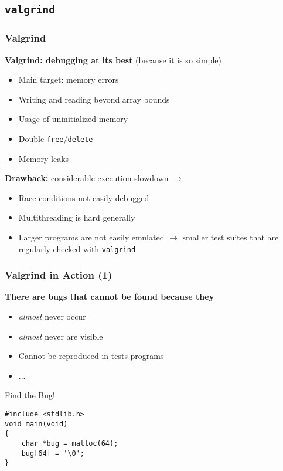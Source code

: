 \subsection{\texttt{valgrind}}

\begin{frame}
  \frametitle{Valgrind}

  \textbf{Valgrind: debugging at its best} (because it is so simple)

  \begin{itemize}
  \item Main target: memory errors
  \item Writing and reading beyond array bounds
  \item Usage of uninitialized memory
  \item Double \texttt{free}/\texttt{delete}
  \item Memory leaks
  \end{itemize}
  
  \textbf{Drawback:} considerable execution slowdown $\to$
  \begin{itemize}
    \item Race conditions not easily debugged
    \item Multithreading is hard generally
    \item Larger programs are not easily emulated $\to$ smaller test
      suites that are regularly checked with \texttt{valgrind}
  \end{itemize}
  
\end{frame}

\begin{frame}[fragile]
  \frametitle{Valgrind in Action (1)}


  \textbf{There are bugs that cannot be found because they}

  \begin{itemize}
  \item \textit{almost} never occur
  \item \textit{almost} never are visible
  \item Cannot be reproduced in tests programs
  \item ...
  \end{itemize}

  \begin{block}{Find the Bug!}
\begin{verbatim}
#include <stdlib.h>
void main(void)
{
    char *bug = malloc(64);
    bug[64] = '\0';
}
\end{verbatim}
  \end{block}

\end{frame}

